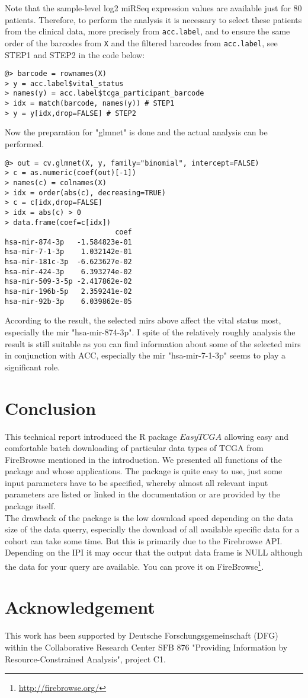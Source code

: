 \documentclass{TechReport}
\begin{document}
Note that the sample-level log2 miRSeq expression values are available just for 80 patients.
Therefore, to perform the analysis it is necessary to select these patients from the clinical data, 
more precisely from {\tt acc.label}, and to ensure the same order of the barcodes from {\tt X}
and the filtered barcodes from {\tt acc.label}, see STEP1 and STEP2 in the code below:
\begin{lstlisting}[style=base]
@> barcode = rownames(X) 
> y = acc.label$vital_status
> names(y) = acc.label$tcga_participant_barcode
> idx = match(barcode, names(y)) # STEP1
> y = y[idx,drop=FALSE] # STEP2
\end{lstlisting}
Now the preparation for "glmnet" is done and the actual analysis can be performed.
\begin{lstlisting}[style=base]
@> out = cv.glmnet(X, y, family="binomial", intercept=FALSE)
> c = as.numeric(coef(out)[-1])
> names(c) = colnames(X)
> idx = order(abs(c), decreasing=TRUE)
> c = c[idx,drop=FALSE]
> idx = abs(c) > 0
> data.frame(coef=c[idx])
                          coef
hsa-mir-874-3p   -1.584823e-01
hsa-mir-7-1-3p    1.032142e-01
hsa-mir-181c-3p  -6.623627e-02
hsa-mir-424-3p    6.393274e-02
hsa-mir-509-3-5p -2.417862e-02
hsa-mir-196b-5p   2.359241e-02
hsa-mir-92b-3p    6.039862e-05
\end{lstlisting}
According to the result, the selected mirs above affect the vital status most,
especially the mir "hsa-mir-874-3p". I spite of the relatively roughly analysis
the result is still suitable as you can find information about some of the selected mirs
 in conjunction with ACC, especially the mir "hsa-mir-7-1-3p" seems to play a significant role.


\section{Conclusion}
This technical report introduced the R package $EasyTCGA$  allowing easy and comfortable
 batch downloading of particular data types of TCGA from FireBrowse mentioned in the introduction. 
We presented all functions of the package and whose applications. The package is quite easy to use, 
just some input parameters have to be specified, whereby almost all relevant input parameters are
listed or linked in the documentation or are provided by the package itself. \\
The drawback of the package is the low download speed depending on the data size of the data
querry, especially the download of all available specific data for a cohort can take some time. But 
this is primarily due to the Firebrowse API.  Depending on the IPI it may occur that the output data frame is NULL
although the data for your query are available. You can prove it on FireBrowse\footnote{\url{http://firebrowse.org/}}.\\





\newpage
\section*{Acknowledgement}

This work has been supported by Deutsche Forschungsgemeinschaft
   (DFG) within the Collaborative Research Center SFB 876 "Providing
   Information by Resource-Constrained Analysis", project C1.
\end{document}
